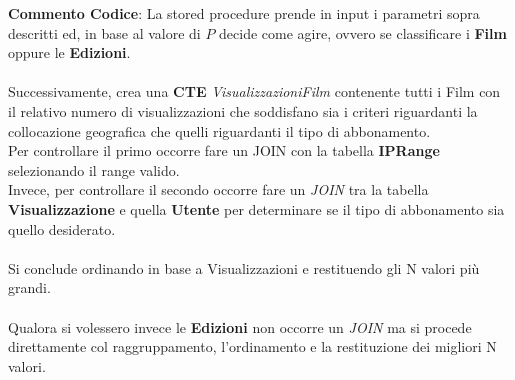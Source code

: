 \documentclass{article}
\begin{document}
\textbf{Commento Codice}: La stored procedure prende in input i parametri sopra descritti ed, in base al valore di $P$ decide come agire, ovvero se classificare i \textbf{Film} oppure le \textbf{Edizioni}. \\ \\
Successivamente, crea una \textbf{CTE} \textit{VisualizzazioniFilm} contenente tutti i Film con il relativo numero di visualizzazioni che soddisfano sia i criteri riguardanti la collocazione geografica che quelli riguardanti il tipo di abbonamento. \\ 
Per controllare il primo occorre fare un JOIN con la tabella \textbf{IPRange} selezionando il range valido. \\
Invece, per controllare il secondo occorre fare un \textit{JOIN} tra la tabella \textbf{Visualizzazione} e quella \textbf{Utente} per determinare se il tipo di abbonamento sia quello desiderato. \\ \\ 
Si conclude ordinando in base a Visualizzazioni e restituendo gli N valori più grandi. \\ \\
Qualora si volessero invece le \textbf{Edizioni} non occorre un \textit{JOIN} ma si procede direttamente col raggruppamento, l'ordinamento e la restituzione dei migliori N valori.
\end{document}
